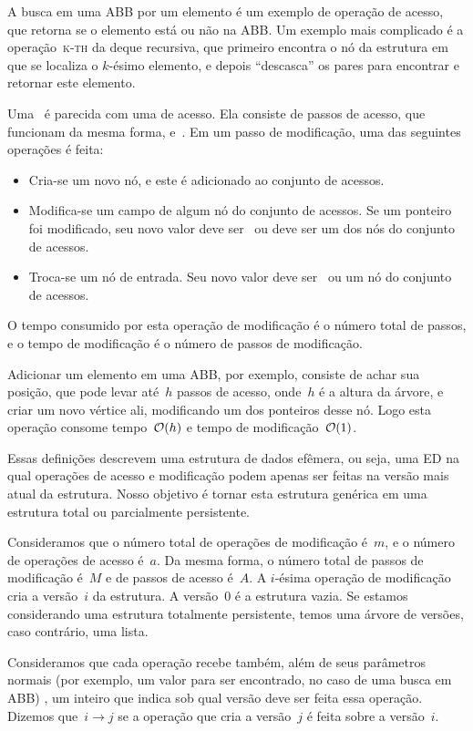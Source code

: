 \documentclass[../../main.tex]{subfiles}
\begin{document}
A busca em uma ABB por um elemento é um exemplo de operação de acesso, que retorna se o elemento está ou não na ABB. Um exemplo mais complicado é a operação~\textsc{k-th} da deque recursiva, que primeiro encontra o nó da estrutura em que se localiza o $k$-ésimo elemento, e depois ``descasca'' os pares para encontrar e retornar este elemento.

Uma~ é parecida com uma de acesso. Ela consiste de passos de acesso, que funcionam da mesma forma, e~. Em um passo de modificação, uma das seguintes operações é feita:
\begin{itemize}
	\item Cria-se um novo nó, e este é adicionado ao conjunto de acessos.
	\item Modifica-se um campo de algum nó do conjunto de acessos. Se um ponteiro foi modificado, seu novo valor deve ser~ ou deve ser um dos nós do conjunto de acessos.
	\item Troca-se um nó de entrada. Seu novo valor deve ser~ ou um nó do conjunto de acessos.
\end{itemize}

O tempo consumido por esta operação de modificação é o número total de passos, e o tempo de modificação é o número de passos de modificação.

Adicionar um elemento em uma ABB, por exemplo, consiste de achar sua posição, que pode levar até~$h$ passos de acesso, onde~$h$ é a altura da árvore, e criar um novo vértice ali, modificando um dos ponteiros desse nó. Logo esta operação consome tempo~$\mathcal{O}(h)$ e tempo de modificação~$\mathcal{O}(1)$.

Essas definições descrevem uma estrutura de dados efêmera, ou seja, uma ED na qual operações de acesso e modificação podem apenas ser feitas na versão mais atual da estrutura. Nosso objetivo é tornar esta estrutura genérica em uma estrutura total ou parcialmente persistente.

Consideramos que o número total de operações de modificação é~$m$, e o número de operações de acesso é~$a$. Da mesma forma, o número total de passos de modificação é~$M$ e de passos de acesso é~$A$. A $i$-ésima operação de modificação cria a versão~$i$ da estrutura. A versão~0 é a estrutura vazia. Se estamos considerando uma estrutura totalmente persistente, temos uma árvore de versões, caso contrário, uma lista.

Consideramos que cada operação recebe também, além de seus parâmetros normais (por exemplo, um valor para ser encontrado, no caso de uma busca em ABB) , um inteiro que indica sob qual versão deve ser feita essa operação. Dizemos que~$i \rightarrow j$ se a operação que cria a versão~$j$ é feita sobre a versão~$i$.
\end{document}
